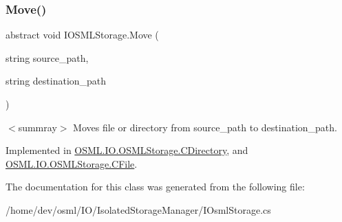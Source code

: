 \mbox{\label{classIOSMLStorage_a8646a392bda2184f21ae3439d67240a5}} 
\subsubsection{\texorpdfstring{Move()}{Move()}}
{\footnotesize\ttfamily abstract void I\+O\+S\+M\+L\+Storage.\+Move (\begin{DoxyParamCaption}\item[{string}]{source\+\_\+path,  }\item[{string}]{destination\+\_\+path }\end{DoxyParamCaption})\hspace{0.3cm}{\ttfamily [pure virtual]}}





$<$summray$>$ Moves file or directory from source\+\_\+path to destination\+\_\+path. 

Implemented in \mbox{\hyperlink{classOSML_1_1IO_1_1OSMLStorage_1_1CDirectory_a3cfadd280f91bf0b01e4ef9114d9499d}{O\+S\+M\+L.\+I\+O.\+O\+S\+M\+L\+Storage.\+C\+Directory}}, and \mbox{\hyperlink{classOSML_1_1IO_1_1OSMLStorage_1_1CFile_a94ec4b71a537df1234a5ca44ae7bd825}{O\+S\+M\+L.\+I\+O.\+O\+S\+M\+L\+Storage.\+C\+File}}.



The documentation for this class was generated from the following file\+:\begin{DoxyCompactItemize}
\item 
/home/dev/osml/\+I\+O/\+Isolated\+Storage\+Manager/I\+Osml\+Storage.\+cs\end{DoxyCompactItemize}

